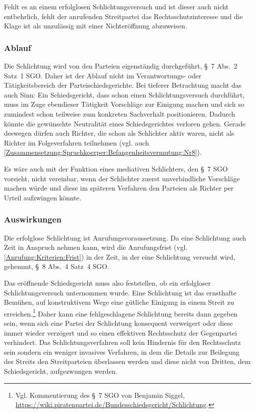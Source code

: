 Fehlt es an einem erfolglosen Schlichtungsversuch und ist dieser auch nicht entbehrlich, fehlt der anrufenden Streitpartei das Rechtsschutzinteresse und die Klage ist als unzulässig mit einer Nichteröffnung abzuweisen.

\subsubsection{Ablauf}
\label{Anrufung:Kriterien:Schlichtung:Ablauf}
Die Schlichtung wird von den Parteien eigenständig durchgeführt, \S~7 Abs.~2 Satz~1 SGO.
Daher ist der Ablauf nicht im Verantwortungs- oder Tätigkeitsbereich der Parteischiedsgerichte.
Bei tieferer Betrachtung macht das auch Sinn:
Ein Schiedsgericht, dass schon einen Schlichtungsversuch durchführt, muss im Zuge ebendieser Tätigkeit Vorschläge zur Einigung machen und sich so zumindest schon teilweise zum konkreten Sachverhalt positionieren.
Dadurch könnte die gewünschte Neutralität eines Schiedsgerichtes verloren gehen.
Gerade deswegen dürfen auch Richter, die schon als Schlichter aktiv waren, nicht als Richter im Folgeverfahren teilnehmen (vgl. auch \ref{Zusammensetzung:Spruchkoerper:Befangenheitsvermutung:Nr8}).

Es wäre auch mit der Funktion eines mediativen Schlichters, den \S~7 SGO vorsieht, nicht vereinbar, wenn der Schlichter zuerst unverbindliche Vorschläge machen würde und diese im späteren Verfahren den Parteien als Richter per Urteil aufzwingen könnte.

\subsubsection{Auswirkungen}
\label{Anrufung:Kriterien:Schlichtung:Auswirkungen}
Die erfolglose Schlichtung ist Anrufungsvoraussetzung.
Da eine Schlichtung auch Zeit in Anspruch nehmen kann, wird die Anrufungsfrist (vgl. \ref{Anrufung:Kriterien:Frist}) in der Zeit, in der eine Schlichtung versucht wird, gehemmt, \S~8 Abs.~4 Satz~4 SGO.

Das eröffnende Schiedsgericht muss also feststellen, ob ein erfolgloser Schlichtungsversuch unternommen wurde.
Eine Schlichtung ist das ernsthafte Bemühen, auf konstruktivem Wege eine gütliche Einigung in einem Streit zu erreichen.\footnote{Vgl. Kommentierung des \S~7 SGO von Benjamin Siggel, \href{https://wiki.piratenpartei.de/Bundesschiedsgericht/Schlichtung}{https://wiki.piratenpartei.de/Bundesschiedsgericht/Schlichtung}.}
Daher kann eine fehlgeschlagene Schlichtung bereits dann gegeben sein, wenn sich eine Partei der Schlichtung konsequent verweigert oder diese immer wieder verzögert und so einen effektiven Rechtsschutz der Gegenpartei verhindert.
Das Schlichtungsverfahren soll kein Hindernis für den Rechtsschutz sein sondern ein weniger invasives Verfahren, in dem die Details zur Beilegung des Streits den Streitparteien überlassen werden und diese nicht von Dritten, dem Schiedsgericht, aufgezwungen werden.

